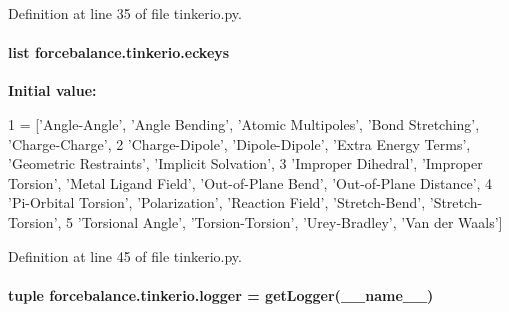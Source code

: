 Definition at line 35 of file tinkerio.\-py.

\hypertarget{namespaceforcebalance_1_1tinkerio_a1038de9d770575e2f7ca27b1649b409c}{
\paragraph[{eckeys}]{\setlength{\rightskip}{0pt plus 5cm}list forcebalance.\-tinkerio.\-eckeys}}\label{namespaceforcebalance_1_1tinkerio_a1038de9d770575e2f7ca27b1649b409c}
{\bfseries Initial value\-:}
\begin{DoxyCode}
1 = [\textcolor{stringliteral}{'Angle-Angle'}, \textcolor{stringliteral}{'Angle Bending'}, \textcolor{stringliteral}{'Atomic Multipoles'}, \textcolor{stringliteral}{'Bond Stretching'}, \textcolor{stringliteral}{'Charge-Charge'}, 
2           \textcolor{stringliteral}{'Charge-Dipole'}, \textcolor{stringliteral}{'Dipole-Dipole'}, \textcolor{stringliteral}{'Extra Energy Terms'}, \textcolor{stringliteral}{'Geometric Restraints'}, \textcolor{stringliteral}{'Implicit
       Solvation'}, 
3           \textcolor{stringliteral}{'Improper Dihedral'}, \textcolor{stringliteral}{'Improper Torsion'}, \textcolor{stringliteral}{'Metal Ligand Field'}, \textcolor{stringliteral}{'Out-of-Plane Bend'}, \textcolor{stringliteral}{'Out-of-Plane
       Distance'}, 
4           \textcolor{stringliteral}{'Pi-Orbital Torsion'}, \textcolor{stringliteral}{'Polarization'}, \textcolor{stringliteral}{'Reaction Field'}, \textcolor{stringliteral}{'Stretch-Bend'}, \textcolor{stringliteral}{'Stretch-Torsion'}, 
5           \textcolor{stringliteral}{'Torsional Angle'}, \textcolor{stringliteral}{'Torsion-Torsion'}, \textcolor{stringliteral}{'Urey-Bradley'}, \textcolor{stringliteral}{'Van der Waals'}]
\end{DoxyCode}


Definition at line 45 of file tinkerio.\-py.

\hypertarget{namespaceforcebalance_1_1tinkerio_afc11cbd0e4ef0c777487ccb9708e0b08}{
\paragraph[{logger}]{\setlength{\rightskip}{0pt plus 5cm}tuple forcebalance.\-tinkerio.\-logger = get\-Logger(\-\_\-\-\_\-name\-\_\-\-\_\-)}}\label{namespaceforcebalance_1_1tinkerio_afc11cbd0e4ef0c777487ccb9708e0b08}



